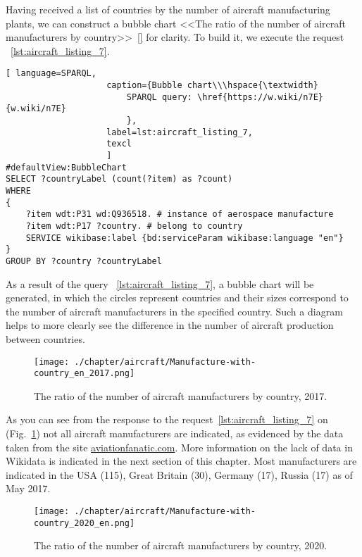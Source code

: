 Having received a list of countries by the number of aircraft manufacturing plants, we can construct a bubble chart 
<<The ratio of the number of aircraft manufacturers by country>>~\ref{} for clarity. To build it, we execute the request ~\ref{lst:aircraft_listing_7}.

\begin{lstlisting}[ language=SPARQL, 
                    caption={Bubble chart\\\hspace{\textwidth}
                        SPARQL query: \href{https://w.wiki/n7E}{w.wiki/n7E}
                        },
                    label=lst:aircraft_listing_7,
                    texcl 
                    ]
#defaultView:BubbleChart
SELECT ?countryLabel (count(?item) as ?count)
WHERE
{
    ?item wdt:P31 wd:Q936518. # instance of aerospace manufacture
  	?item wdt:P17 ?country. # belong to country
    SERVICE wikibase:label {bd:serviceParam wikibase:language "en"}
}
GROUP BY ?country ?countryLabel
\end{lstlisting}

As a result of the query ~\ref{lst:aircraft_listing_7}, a bubble chart will be generated, in which the circles represent countries and their 
sizes correspond to the number of aircraft manufacturers in the specified country. Such a diagram helps to more clearly see the difference 
in the number of aircraft production between countries.

\begin{figure}[h!]
\centering
	\texttt{[image: ./chapter/aircraft/Manufacture-with-country\_en\_2017.png]}
	\caption{The ratio of the number of aircraft manufacturers by country, 2017.}
	\label{fig:Manufacture-with-country_en_2017}
\end{figure}

As you can see from the response to the request~\ref{lst:aircraft_listing_7} on (Fig.~\ref{fig:Manufacture-with-country_en_2017}) not all 
aircraft manufacturers are indicated, as evidenced by the data taken from the site \href{https://www.aviationfanatic.com/}{aviationfanatic.com}. 
More information on the lack of data in Wikidata is indicated in the next section of this chapter. Most manufacturers are indicated in the 
USA (115), Great Britain (30), Germany (17), Russia (17) as of May 2017.

\begin{figure}[h!]
\centering
	\texttt{[image: ./chapter/aircraft/Manufacture-with-country\_2020\_en.png]}
	\caption{The ratio of the number of aircraft manufacturers by country, 2020.}
	\label{fig:Manufacture-with-country_2020_en}
\end{figure}


